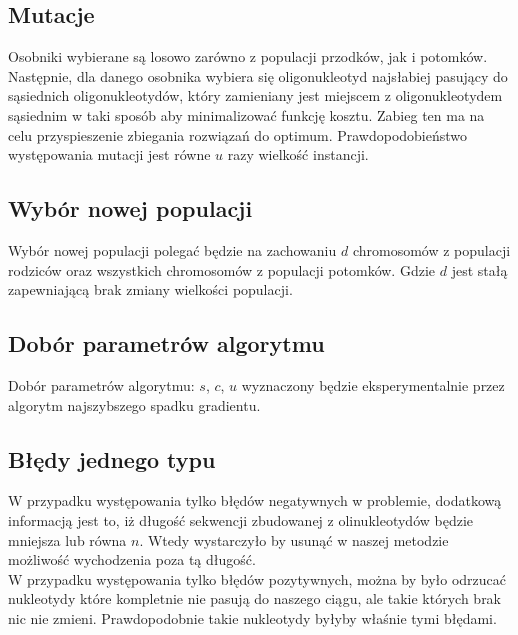 \documentclass{article}
\begin{document}
\subsection{Mutacje}
Osobniki wybierane są losowo zarówno z populacji przodków, jak i potomków. Następnie, dla danego osobnika wybiera się oligonukleotyd najsłabiej pasujący do sąsiednich oligonukleotydów, który zamieniany jest miejscem z oligonukleotydem sąsiednim w taki sposób aby minimalizować funkcję kosztu. Zabieg ten ma na celu przyspieszenie zbiegania rozwiązań do optimum. Prawdopodobieństwo występowania mutacji jest równe $u$ razy wielkość instancji.
\subsection{Wybór nowej populacji}
Wybór nowej populacji polegać będzie na zachowaniu $d$ chromosomów z populacji rodziców oraz wszystkich chromosomów z populacji potomków. Gdzie $d$ jest stałą zapewniającą brak zmiany wielkości populacji.
\subsection{Dobór parametrów algorytmu}
Dobór parametrów algorytmu:
$s$,
$c$,
$u$
wyznaczony będzie eksperymentalnie przez algorytm najszybszego spadku gradientu.
\subsection{Błędy jednego typu}
W przypadku występowania tylko błędów negatywnych w problemie, dodatkową informacją jest to, iż długość sekwencji zbudowanej z olinukleotydów będzie mniejsza lub równa $n$. Wtedy wystarczyło by usunąć w naszej metodzie możliwość wychodzenia poza tą długość. \\
W przypadku występowania tylko błędów pozytywnych, można by było odrzucać nukleotydy które kompletnie nie pasują do naszego ciągu, ale takie których brak nic nie zmieni. Prawdopodobnie takie nukleotydy byłyby właśnie tymi błędami.  
\end{document}
